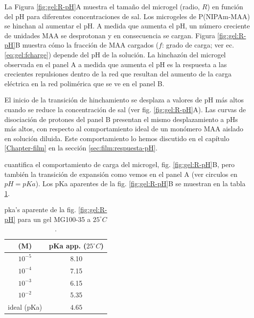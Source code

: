 La Figura \ref{fig:gel:R-pH}A muestra el tama\~no del microgel (radio, $R$) en funci\'on del pH para diferentes concentraciones de sal.
Los microgeles de  P(NIPAm-MAA) se hinchan al aumentar el pH.
A medida que aumenta el pH, un n\'umero creciente de unidades MAA se desprotonan y en consecuencia se cargan.
Figura \ref{fig:gel:R-pH}B muestra c\'omo la fracci\'on de MAA cargados ($f$: grado de carga; ver ec. \ref{eq:gel:fcharge}) depende del pH de la soluci\'on.
La hinchaz\'on del microgel observada en el panel A a medida que aumenta el pH es la respuesta a las crecientes repulsiones dentro de la red que resultan del aumento de la carga el\'ectrica en la red polim\'erica que se ve en el panel B.


El inicio de la transici\'on de hinchamiento se desplaza a valores de pH m\'as altos cuando se reduce la concentraci\'on de sal (ver fig. \ref{fig:gel:R-pH}A).
Las curvas de disociaci\'on de protones del panel B presentan el mismo desplazamiento a pHs m\'as altos, con respecto al comportamiento ideal de un mon\'omero MAA aislado en soluci\'on diluida.
Este comportamiento lo hemos discutido en el cap\'itulo \ref{Chapter-film} en la secci\'on \ref{sec:film:respuesta-pH}.


cuantifica el comportamiento de carga del microgel, fig. \ref{fig:gel:R-pH}B, pero tambi\'en la transici\'on de expansi\'on como vemos en el panel A (ver circulos en $pH=pKa$).
Los pKa aparentes de la fig. \ref{fig:gel:R-pH}B se muestran en la tabla \ref{table:gel:pKa_app}.

\begin{center}
\begin{table}[!htb]
\small
  \begin{tabular}{|cc|}
    \hline
      [NaCl] (M)&  pKa app. ($25 ^\circ C$)  \\
      \hline
    $10^{-5}$ & 8.10  \\
    $10^{-4}$ & 7.15 \\
    $10^{-3}$ & 6.15 \\
    $10^{-2}$ & 5.35 \\
    ideal (pKa) &  $4.65$  \\
    \hline
  \end{tabular}
 \caption{ pka's aparente de la fig. \ref{fig:gel:R-pH} para un gel MG100-35 a $25 ^\circ C$.}
\label{table:gel:pKa_app} 
\end{table}
\end{center}

